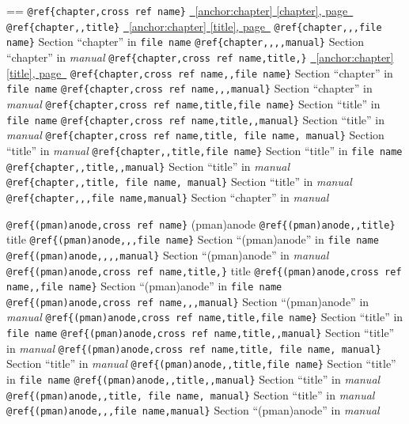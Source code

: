 \documentclass{book}
\makeatletter
\newenvironment{GNUTexinfopreformatted}{%
  \par\obeylines\obeyspaces\frenchspacing
  \parskip=\z@\parindent=\z@}{}
\makeatother
\begin{document}
\begin{GNUTexinfopreformatted}
\texttt{@ref\{chapter,cross ref name\}} \hyperref[anchor:chapter]{\chaptername~\ref*{anchor:chapter} [chapter], page~\pageref*{anchor:chapter}}
\texttt{@ref\{chapter{,}{,}title\}} \hyperref[anchor:chapter]{\chaptername~\ref*{anchor:chapter} [title], page~\pageref*{anchor:chapter}}
\texttt{@ref\{chapter{,}{,},file name\}} Section ``chapter'' in \texttt{file name}
\texttt{@ref\{chapter{,}{,}{,}{,}manual\}} Section ``chapter'' in \textsl{manual}
\texttt{@ref\{chapter,cross ref name,title,\}} \hyperref[anchor:chapter]{\chaptername~\ref*{anchor:chapter} [title], page~\pageref*{anchor:chapter}}
\texttt{@ref\{chapter,cross ref name{,}{,}file name\}} Section ``chapter'' in \texttt{file name}
\texttt{@ref\{chapter,cross ref name{,}{,},manual\}} Section ``chapter'' in \textsl{manual}
\texttt{@ref\{chapter,cross ref name,title,file name\}} Section ``title'' in \texttt{file name}
\texttt{@ref\{chapter,cross ref name,title{,}{,}manual\}} Section ``title'' in \textsl{manual}
\texttt{@ref\{chapter,cross ref name,title,\ file name,\ manual\}} Section ``title'' in \textsl{manual}
\texttt{@ref\{chapter{,}{,}title,file name\}} Section ``title'' in \texttt{file name}
\texttt{@ref\{chapter{,}{,}title{,}{,}manual\}} Section ``title'' in \textsl{manual}
\texttt{@ref\{chapter{,}{,}title,\ file name,\ manual\}} Section ``title'' in \textsl{manual}
\texttt{@ref\{chapter{,}{,},file name,manual\}} Section ``chapter'' in \textsl{manual}


\texttt{@ref\{(pman)anode,cross ref name\}} (pman)anode
\texttt{@ref\{(pman)anode{,}{,}title\}} title
\texttt{@ref\{(pman)anode{,}{,},file name\}} Section ``(pman)anode'' in \texttt{file name}
\texttt{@ref\{(pman)anode{,}{,}{,}{,}manual\}} Section ``(pman)anode'' in \textsl{manual}
\texttt{@ref\{(pman)anode,cross ref name,title,\}} title
\texttt{@ref\{(pman)anode,cross ref name{,}{,}file name\}} Section ``(pman)anode'' in \texttt{file name}
\texttt{@ref\{(pman)anode,cross ref name{,}{,},manual\}} Section ``(pman)anode'' in \textsl{manual}
\texttt{@ref\{(pman)anode,cross ref name,title,file name\}} Section ``title'' in \texttt{file name}
\texttt{@ref\{(pman)anode,cross ref name,title{,}{,}manual\}} Section ``title'' in \textsl{manual}
\texttt{@ref\{(pman)anode,cross ref name,title,\ file name,\ manual\}} Section ``title'' in \textsl{manual}
\texttt{@ref\{(pman)anode{,}{,}title,file name\}} Section ``title'' in \texttt{file name}
\texttt{@ref\{(pman)anode{,}{,}title{,}{,}manual\}} Section ``title'' in \textsl{manual}
\texttt{@ref\{(pman)anode{,}{,}title,\ file name,\ manual\}} Section ``title'' in \textsl{manual}
\texttt{@ref\{(pman)anode{,}{,},file name,manual\}} Section ``(pman)anode'' in \textsl{manual}



\end{GNUTexinfopreformatted}
\end{document}
